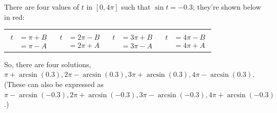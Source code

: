 \documentclass[main]{subfiles}
\begin{document}
\begin{enumerate}
\begin{enumerate}
\begin{solution}
      There are four values of $t$ in $[0, 4 \pi]$ such that $\sin t =
      -0.3$; they're shown below in red:
      \begin{center}
        \begin{tabular}{cccc}
          \begin{tikzangle}[angle=pi+rad(asin(0.3)), label=$t$, func=sin,
            functick=$-0.3$, labelpos=0.55]           
          \end{tikzangle} &
          \begin{tikzangle}[angle=2*pi-rad(asin(0.3)), label=$t$, func=sin,
            functick=$-0.3$, labelpos=0.4]           
          \end{tikzangle} &
          \begin{tikzangle}[angle=3*pi+rad(asin(0.3)), label=$\ t$, func=sin,
            functick=$-0.3$]           
          \end{tikzangle} &
          \begin{tikzangle}[angle=4*pi-rad(asin(0.3)), label=$\ t$, func=sin,
            functick=$-0.3$]           
          \end{tikzangle} \\
          $\displaystyle 
          \begin{aligned}
            t &= \pi + B \\
            &= \pi - A
          \end{aligned}$ & 
          $\displaystyle 
          \begin{aligned}
            t &= 2\pi - B \\
            &= 2\pi + A
          \end{aligned}$ & 
          $\displaystyle 
          \begin{aligned}
            t &= 3\pi + B \\
            &= 3\pi - A
          \end{aligned}$ & 
          $\displaystyle 
          \begin{aligned}
            t &= 4\pi - B \\
            &= 4\pi + A
          \end{aligned}$ 
        \end{tabular}
      \end{center}
      So, there are four solutions, $\boxed{\pi + \arcsin(0.3), 2 \pi -
        \arcsin(0.3), 3 \pi + \arcsin(0.3), 4 \pi - \arcsin(0.3)}$.
      (These can also be expressed as 
      $ \pi - \arcsin(-0.3), 2\pi +\arcsin(-0.3), 3 \pi - \arcsin(-0.3),
      4\pi +\arcsin(-0.3)$.) 
    \end{solution}


\end{enumerate}
\end{enumerate}
\end{document}
